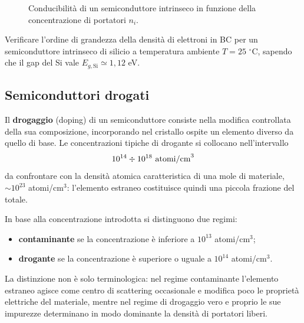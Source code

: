 \begin{figure}[htbp]
    \centering
    \caption{Conducibilità di un semiconduttore intrinseco in funzione della concentrazione di portatori \( n_i \).}
    \label{fig:sigma_ni_intrinseco}
\end{figure}

\begin{exercise}
    Verificare l'ordine di grandezza della densità di elettroni in BC per un semiconduttore intrinseco di silicio a temperatura ambiente \( T = 25 \) \(^\circ\)C, sapendo che il gap del Si vale \( E_{g,\text{Si}} \simeq 1{,}12 \) eV.
\end{exercise}

\subsection{Semiconduttori drogati}

Il \textbf{drogaggio} (doping) di un semiconduttore consiste nella modifica controllata della sua composizione, incorporando nel cristallo ospite un elemento diverso da quello di base. Le concentrazioni tipiche di drogante si collocano nell'intervallo
\begin{equation}
    10^{14} \divisionsymbol 10^{18} \ \text{atomi/cm}^3
\end{equation}
da confrontare con la densità atomica caratteristica di una mole di materiale, \( \sim 10^{23} \) atomi/cm\(^3\): l'elemento estraneo costituisce quindi una piccola frazione del totale.

In base alla concentrazione introdotta si distinguono due regimi:
\begin{itemize}
    \item \textbf{contaminante} se la concentrazione è inferiore a \( 10^{13} \) atomi/cm\(^3\);
    \item \textbf{drogante} se la concentrazione è superiore o uguale a \( 10^{14} \) atomi/cm\(^3\).
\end{itemize}
La distinzione non è solo terminologica: nel regime contaminante l'elemento estraneo agisce come centro di scattering occasionale e modifica poco le proprietà elettriche del materiale, mentre nel regime di drogaggio vero e proprio le sue impurezze determinano in modo dominante la densità di portatori liberi.

